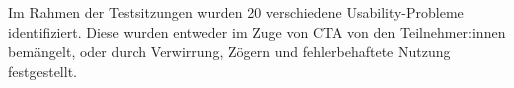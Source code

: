 \vspace{\baselineskip}


Im Rahmen der Testsitzungen wurden 20 verschiedene Usability-Probleme identifiziert. Diese wurden entweder im Zuge von \ac{CTA} von den Teilnehmer:innen bemängelt, oder durch Verwirrung, Zögern und fehlerbehaftete Nutzung festgestellt.

